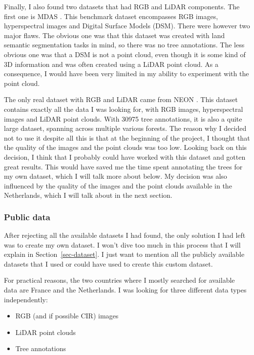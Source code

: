\documentclass[
  letterpaper,
  DIV=11,
  numbers=noendperiod]{scrartcl}
\providecommand{\tightlist}{%
  \setlength{\itemsep}{0pt}\setlength{\parskip}{0pt}}\usepackage{longtable,booktabs,array}
\begin{document}
Finally, I also found two datasets that had RGB and LiDAR components.
The first one is MDAS \autocite{MDAS}. This benchmark dataset
encompasses RGB images, hyperspectral images and Digital Surface Models
(DSM). There were however two major flaws. The obvious one was that this
dataset was created with land semantic segmentation tasks in mind, so
there was no tree annotations. The less obvious one was that a DSM is
not a point cloud, even though it is some kind of 3D information and was
often created using a LiDAR point cloud. As a consequence, I would have
been very limited in my ability to experiment with the point cloud.

The only real dataset with RGB and LiDAR came from NEON
\autocite{NEONdata}. This dataset contains exactly all the data I was
looking for, with RGB images, hyperspectral images and LiDAR point
clouds. With 30975 tree annotations, it is also a quite large dataset,
spanning across multiple various forests. The reason why I decided not
to use it despite all this is that at the beginning of the project, I
thought that the quality of the images and the point clouds was too low.
Looking back on this decision, I think that I probably could have worked
with this dataset and gotten great results. This would have saved me the
time spent annotating the trees for my own dataset, which I will talk
more about below. My decision was also influenced by the quality of the
images and the point clouds available in the Netherlands, which I will
talk about in the next section.

\subsubsection{Public data}\label{public-data}

After rejecting all the available datasets I had found, the only
solution I had left was to create my own dataset. I won't dive too much
in this process that I will explain in Section~\ref{sec-dataset}. I just
want to mention all the publicly available datasets that I used or could
have used to create this custom dataset.

For practical reasons, the two countries where I mostly searched for
available data are France and the Netherlands. I was looking for three
different data types independently:

\begin{itemize}
\tightlist
\item
  RGB (and if possible CIR) images
\item
  LiDAR point clouds
\item
  Tree annotations
\end{itemize}
\end{document}
